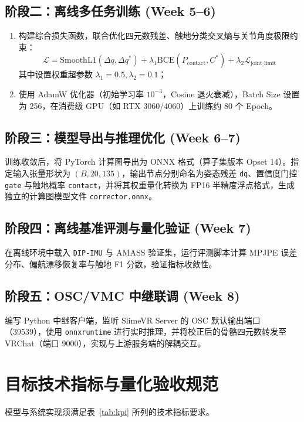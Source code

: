 \documentclass[UTF8,11pt,a4paper]{ctexart}
\begin{document}
\subsection{阶段二：离线多任务训练 (Week 5--6)}
\begin{enumerate}
    \item 构建综合损失函数，联合优化四元数残差、触地分类交叉熵与关节角度极限约束：
    \[
    \mathcal{L} = \text{SmoothL1}(\Delta q, \Delta q^*) + \lambda_1 \text{BCE}(P_{\text{contact}}, C^*) + \lambda_2 \mathcal{L}_{\text{joint\_limit}}
    \]
    其中设置权重超参数 $\lambda_1 = 0.5, \lambda_2 = 0.1$；
    \item 使用 AdamW 优化器（初始学习率 $10^{-3}$，Cosine 退火衰减），Batch Size 设置为 256，在消费级 GPU（如 RTX 3060/4060）上训练约 80 个 Epoch。
\end{enumerate}

\subsection{阶段三：模型导出与推理优化 (Week 6--7)}
训练收敛后，将 PyTorch 计算图导出为 ONNX 格式（算子集版本 Opset 14）。指定输入张量形状为 $(B, 20, 135)$，输出节点分别命名为姿态残差 \texttt{dq}、置信度门控 \texttt{gate} 与触地概率 \texttt{contact}，并将其权重量化转换为 FP16 半精度浮点格式，生成独立的计算图模型文件 \texttt{corrector.onnx}。

\subsection{阶段四：离线基准评测与量化验证 (Week 7)}
在离线环境中载入 \texttt{DIP-IMU} 与 AMASS 验证集，运行评测脚本计算 MPJPE 误差分布、偏航漂移恢复率与触地 F1 分数，验证指标收敛性。

\subsection{阶段五：OSC/VMC 中继联调 (Week 8)}
编写 Python 中继客户端，监听 SlimeVR Server 的 OSC 默认输出端口（39539），使用 \texttt{onnxruntime} 进行实时推理，并将校正后的骨骼四元数转发至 VRChat（端口 9000），实现与上游服务端的解耦交互。

\section{目标技术指标与量化验收规范}
\label{sec:kpi}

模型与系统实现须满足表~\ref{tab:kpi} 所列的技术指标要求。
\end{document}
